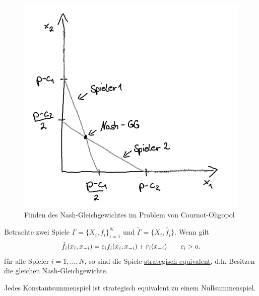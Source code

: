 \begin{beispiel}
\begin{figure}[ht!]
\begin{center}
	\includegraphics[scale=0.6]{pics/1.png}
\end{center}
\caption{Finden des Nash-Gleichgewichtes im Problem von Cournot-Oligopol}
\label{fig:CournotOligopolBsp_2}
\end{figure}
\end{beispiel}

\begin{satz}
	Betrachte zwei Spiele $\Gamma=\{X_{i}, f_{i}\}_{i=1}^{N}$ und $\tilde{\Gamma} = \{X_{i}, \tilde{f_{i}}\}$. Wenn gilt 
	\[
		\tilde{f_{i}}(x_{i},x_{-i}) = c_{i}f_{i}(x_{i}, x_{-i}) + r_{i}(x_{-i}) \qquad \mit c_{i} > 0
	.\] 
	für alle Spieler $i=1, \ldots, N$, so sind die Spiele \underline{strategisch equivalent}, d.h. Besitzen die gleichen Nash-Gleichgewichte.
\end{satz}

\begin{satz}
	Jedes Konstantsummenspiel ist strategisch equivalent zu einem Nullsummenspiel.
\end{satz}

